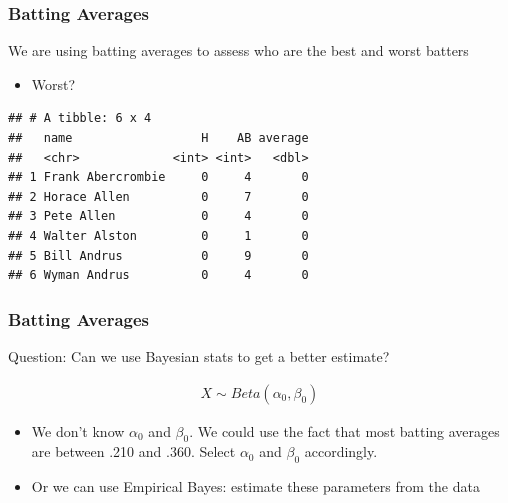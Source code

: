 \documentclass[
  shownotes,
  xcolor={svgnames},
  hyperref={colorlinks,citecolor=DarkBlue,linkcolor=DarkRed,urlcolor=DarkBlue}
  ]{beamer}
\begin{document}
\begin{frame}[fragile]
\frametitle{Batting Averages}

We are using batting averages to assess who are the best and worst batters

\begin{itemize}
  \item Worst?
\end{itemize}

\begin{small}
\begin{verbatim}
## # A tibble: 6 x 4
##   name                  H    AB average
##   <chr>             <int> <int>   <dbl>
## 1 Frank Abercrombie     0     4       0
## 2 Horace Allen          0     7       0
## 3 Pete Allen            0     4       0
## 4 Walter Alston         0     1       0
## 5 Bill Andrus           0     9       0
## 6 Wyman Andrus          0     4       0
\end{verbatim}
\end{small}

\end{frame}
\begin{frame}[fragile]
\frametitle{Batting Averages}

Question: Can we use Bayesian stats to get a better estimate?

\bigskip
\begin{align}
X \sim Beta(\alpha_0,\beta_0)
\end{align}
\bigskip
\begin{itemize}
  \item We don't know $\alpha_0$ and $\beta_0$. We could use the fact that most batting averages are between .210 and .360. Select $\alpha_0$ and $\beta_0$ accordingly.
  \bigskip
  \item Or we can use Empirical Bayes: estimate these parameters from the data
\end{itemize}


\end{frame}
\end{document}
